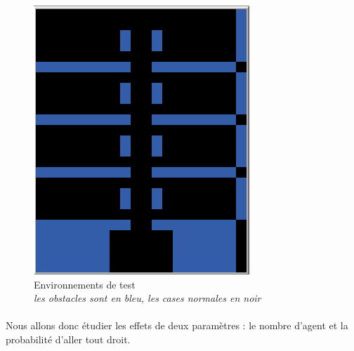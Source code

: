 \documentclass{article}
\begin{document}
\begin{figure}[!h]
\begin{center}
                \includegraphics[width = \textwidth/4]{corridor_png.PNG}
                \caption{Environnements de test \\ \textit{les obstacles sont en bleu, les cases normales en noir}}
            \end{center}
        \end{figure}

        \paragraph{} Nous allons donc étudier les effets de deux paramètres : le nombre d'agent et la probabilité d'aller tout droit.
\end{document}
